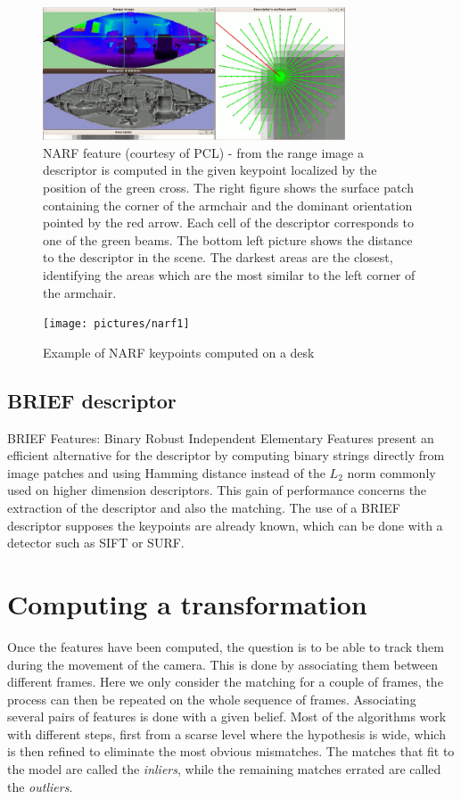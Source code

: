\begin{figure}[H]
\centering
\includegraphics[width=0.8\textwidth]{figures/narf_descriptor_visualization}
\caption{NARF feature (courtesy of PCL) - from the range image a descriptor is computed in the given keypoint localized by the position of the green cross. The right figure shows the surface patch containing the corner of the armchair and the dominant orientation pointed by the red arrow. Each cell of the descriptor corresponds to one of the green beams. The bottom left picture shows the distance to the descriptor in the scene. The darkest areas are the closest, identifying the areas which are the most similar to the left corner of the armchair.}
\end{figure}

\begin{figure}[H]
\centering
\texttt{[image: pictures/narf1]}
\caption{Example of NARF keypoints computed on a desk}
\end{figure}

\subsection{BRIEF descriptor}

BRIEF Features\cite{Calonder10-brief}: Binary Robust Independent Elementary Features present an efficient alternative for the descriptor by computing  binary strings directly from image patches and using Hamming distance instead of the $L_2$ norm commonly used on higher dimension descriptors. This gain of performance concerns the extraction of the descriptor and also the matching. The use of a BRIEF descriptor supposes the keypoints are already known, which can be done with a detector such as SIFT or SURF.

\section{Computing a transformation}

Once the features have been computed, the question is to be able to track them during the movement of the camera. This is done by associating them between different frames. Here we only consider the matching for a couple of frames, the process can then be repeated on the whole sequence of frames. Associating several pairs of features is done with a given belief. Most of the algorithms work with different steps, first from a scarse level where the hypothesis is wide, which is then refined to eliminate the most obvious mismatches. The matches that fit to the model are called the \emph{inliers}, while the remaining matches errated are called the \emph{outliers}.

